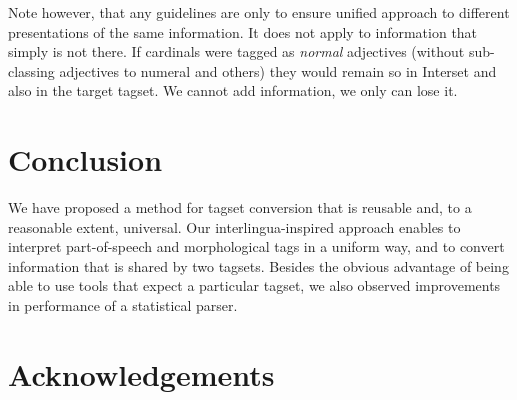 \documentclass[11pt]{article}
\newcommand{\XXX}{\textcolor{red}{XXX }} %
\begin{document}
Note however, that any guidelines are only to ensure unified approach to different presentations of the same information. It does not apply to information that simply is not there. If cardinals were tagged as \textit{normal} adjectives (without sub-classing adjectives to numeral and others) they would remain so in Interset and also in the target tagset. We cannot add information, we only can lose it.

\section{Conclusion}
\label{sec:conclusion}

We have proposed a method for tagset conversion that is reusable and, to a reasonable extent, universal. Our interlingua-inspired approach enables to interpret part-of-speech and morphological tags in a uniform way, and to convert information that is shared by two tagsets. Besides the obvious advantage of being able to use tools that expect a particular tagset, we also observed improvements in performance of a statistical parser.

\section*{Acknowledgements}


\begin{small}

\end{small}
\end{document}
